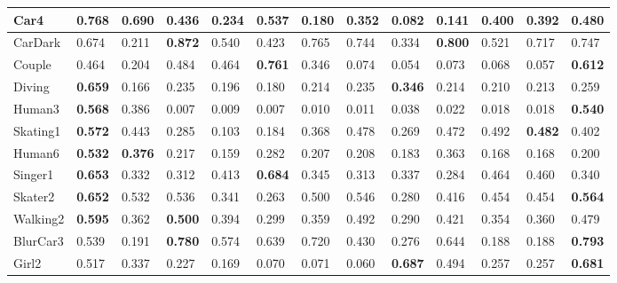 \documentclass{article}
\begin{document}
\begin{table}[t]
\begin{tabular}{|l|l|l|l|l|l|l|l|l|l|l|l|l|}
		Car4 & {\color[HTML]{32CB00} \textbf{0.768}} & {\color[HTML]{FE0000} \textbf{0.690}} & 0.436 & 0.234 & 0.537 & 0.180 & 0.352 & 0.082 & 0.141 & 0.400 & 0.392 & 0.480 \\ \hline
		CarDark & 0.674 & 0.211 & {\color[HTML]{32CB00} \textbf{0.872}} & 0.540 & 0.423 & 0.765 & 0.744 & 0.334 & {\color[HTML]{FE0000} \textbf{0.800}} & 0.521 & 0.717 & 0.747 \\ \hline
		Couple & {\color[HTML]{333333} 0.464} & 0.204 & 0.484 & 0.464 & {\color[HTML]{009901} \textbf{0.761}} & 0.346 & 0.074 & 0.054 & 0.073 & 0.068 & 0.057 & {\color[HTML]{FE0000} \textbf{0.612}} \\ \hline
		Diving & {\color[HTML]{32CB00} \textbf{0.659}} & {\color[HTML]{333333} 0.166} & 0.235 & 0.196 & 0.180 & 0.214 & 0.235 & {\color[HTML]{FE0000} \textbf{0.346}} & 0.214 & 0.210 & 0.213 & 0.259 \\ \hline
		Human3 & {\color[HTML]{32CB00} \textbf{0.568}} & {\color[HTML]{333333} 0.386} & 0.007 & 0.009 & 0.007 & 0.010 & 0.011 & 0.038 & 0.022 & 0.018 & 0.018 & {\color[HTML]{FE0000} \textbf{0.540}} \\ \hline
		Skating1 & {\color[HTML]{32CB00} \textbf{0.572}} & 0.443 & 0.285 & 0.103 & 0.184 & 0.368 & 0.478 & 0.269 & 0.472 & 0.492 & {\color[HTML]{FE0000} \textbf{0.482}} & 0.402 \\ \hline
		Human6 & {\color[HTML]{32CB00} \textbf{0.532}} & {\color[HTML]{FE0000} \textbf{0.376}} & 0.217 & 0.159 & 0.282 & 0.207 & 0.208 & 0.183 & 0.363 & 0.168 & 0.168 & 0.200 \\ \hline
		Singer1 & {\color[HTML]{FE0000} \textbf{0.653}} & 0.332 & 0.312 & 0.413 & {\color[HTML]{32CB00} \textbf{0.684}} & 0.345 & 0.313 & 0.337 & 0.284 & {\color[HTML]{333333} 0.464} & 0.460 & 0.340 \\ \hline
		Skater2 & {\color[HTML]{32CB00} \textbf{0.652}} & {\color[HTML]{333333} 0.532} & 0.536 & 0.341 & 0.263 & 0.500 & 0.546 & 0.280 & 0.416 & 0.454 & 0.454 & {\color[HTML]{FE0000} \textbf{0.564}} \\ \hline
		Walking2 & {\color[HTML]{32CB00} \textbf{0.595}} & 0.362 & {\color[HTML]{FE0000} \textbf{0.500}} & 0.394 & 0.299 & 0.359 & 0.492 & 0.290 & 0.421 & 0.354 & 0.360 & 0.479 \\ \hline
		BlurCar3 & 0.539 & 0.191 & {\color[HTML]{FE0000} \textbf{0.780}} & 0.574 & 0.639 & {\color[HTML]{333333} 0.720} & 0.430 & 0.276 & 0.644 & 0.188 & 0.188 & {\color[HTML]{32CB00} \textbf{0.793}} \\ \hline
		Girl2 & {\color[HTML]{333333} 0.517} & 0.337 & 0.227 & 0.169 & 0.070 & 0.071 & 0.060 & {\color[HTML]{32CB00} \textbf{0.687}} & 0.494 & 0.257 & 0.257 & {\color[HTML]{FE0000} \textbf{0.681}} \\ \hline
	\end{tabular}
\end{table}
\end{document}
